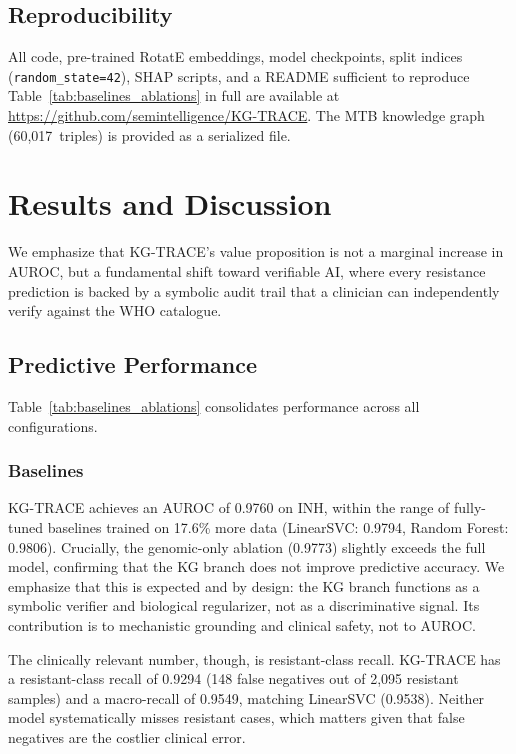 \documentclass[conference]{IEEEtran}
\begin{document}
\subsection{Reproducibility}

All code, pre-trained RotatE embeddings, model checkpoints, split indices (\texttt{random\_state=42}), SHAP scripts, and a README sufficient to reproduce Table~\ref{tab:baselines_ablations} in full are available at \url{https://github.com/semintelligence/KG-TRACE}. The MTB knowledge graph (60,017~triples) is provided as a serialized file.

\section{Results and Discussion}\label{sec:results}
We emphasize that KG-TRACE's value proposition is not a marginal increase in AUROC, but a fundamental shift toward verifiable AI, where every resistance prediction is backed by a symbolic audit trail that a clinician can independently verify against the WHO catalogue.
\subsection{Predictive Performance}\label{ssec:main_results}

Table~\ref{tab:baselines_ablations} consolidates performance across all configurations.

\subsubsection{Baselines}\label{ssec:baselines}

KG-TRACE achieves an AUROC of 0.9760 on INH, within the range of fully-tuned baselines trained on 17.6\% more data (LinearSVC: 0.9794, Random Forest: 0.9806). Crucially, the genomic-only ablation (0.9773) slightly exceeds the full model, confirming that the KG branch does not improve predictive accuracy. We emphasize that this is expected and by design: the KG branch functions as a symbolic verifier and biological regularizer, not as a discriminative signal. Its contribution is to mechanistic grounding and clinical safety, not to AUROC.

The clinically relevant number, though, is resistant-class recall. KG-TRACE has a resistant-class recall of 0.9294 (148 false negatives out of 2,095 resistant samples) and a macro-recall of 0.9549, matching LinearSVC (0.9538). Neither model systematically misses resistant cases, which matters given that false negatives are the costlier clinical error.
\end{document}

